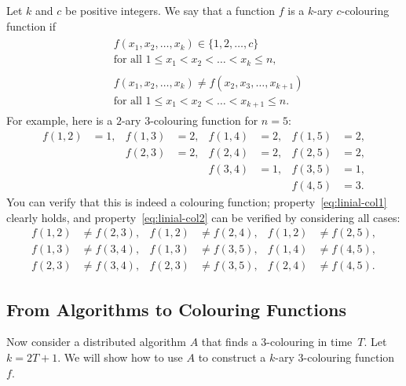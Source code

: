 Let $k$ and $c$ be positive integers. We say that a function $f$ is a $k$-ary $c$-colouring function if
\begin{align}
    \begin{split}
    &f(x_1, x_2, \dotsc, x_k) \in \{1,2,\dotsc,c\} \\
    &\text{for all } 1 \le x_1 < x_2 < \dotso < x_k \le n,
    \end{split}
    \label{eq:linial-col1} \\[3pt]
    \begin{split}
    &f(x_1, x_2, \dotsc, x_k) \ne f(x_2, x_3, \dotsc, x_{k+1}) \\
    &\text{for all } 1 \le x_1 < x_2 < \dotso < x_{k+1} \le n.
    \end{split}
    \label{eq:linial-col2}
\end{align}
For example, here is a $2$-ary $3$-colouring function for $n = 5$:
\begin{align*}
    f(1,2) &= 1, &
    f(1,3) &= 2, &
    f(1,4) &= 2, &
    f(1,5) &= 2, \\&&
    f(2,3) &= 2, &
    f(2,4) &= 2, &
    f(2,5) &= 2, \\&&&&
    f(3,4) &= 1, &
    f(3,5) &= 1, \\&&&&&&
    f(4,5) &= 3.
\end{align*}
You can verify that this is indeed a colouring function; property~\eqref{eq:linial-col1} clearly holds, and property~\eqref{eq:linial-col2} can be verified by considering all cases:
\begin{align*}
    f(1,2) &\ne f(2,3), &
    f(1,2) &\ne f(2,4), &
    f(1,2) &\ne f(2,5), \\
    f(1,3) &\ne f(3,4), &
    f(1,3) &\ne f(3,5), &
    f(1,4) &\ne f(4,5), \\
    f(2,3) &\ne f(3,4), &
    f(2,3) &\ne f(3,5), &
    f(2,4) &\ne f(4,5).
\end{align*}


\subsection[Algorithms vs.\ Colouring Functions]{From Algorithms to Colouring Functions}

Now consider a distributed algorithm $A$ that finds a $3$-colouring in time~$T$. Let $k = 2T+1$. We will show how to use $A$ to construct a $k$-ary $3$-colouring function $f$.

